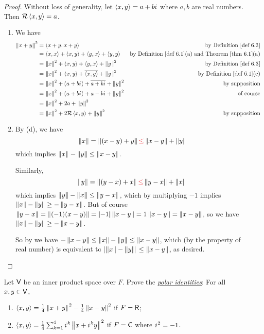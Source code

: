 \begin{proof}
Without loss of generality, let \(\left< x, y \right> = a + b{i\mkern1mu}\) where \(a, b\) are real numbers.
Then \(\mathcal{R}\left< x, y \right> = a\).
\begin{enumerate}
\item We have
\begin{align*}
    \norm{x + y}^2 & = \LG x + y, x + y \RG & \text{by \DEF{6.3}} \\
        & = \LG x, x \RG + \LG x, y \RG + \LG y, x \RG + \LG y, y \RG & \text{by \DEF{6.1}(a) and \THM{6.1}(a)} \\
        & = \norm{x}^2 + \LG x, y \RG + \LG y, x \RG + \norm{y}^2 & \text{by \DEF{6.3}} \\
        & = \norm{x}^2 + \LG x, y \RG + \conjugatet{\LG x, y \RG} + \norm{y}^2 & \text{by \DEF{6.1}(c)} \\
        & = \norm{x}^2 + (a + b\iu) + \conjugatet{a + b\iu} + \norm{y}^2 & \text{by supposition} \\
        & = \norm{x}^2 + (a + b\iu) + a - b\iu + \norm{y}^2 & \text{of course} \\
        & = \norm{x}^2 + 2a + \norm{y}^2 \\
        & = \norm{x}^2 + 2\mathcal{R}\LG x, y \RG + \norm{y}^2 & \text{by supposition}
\end{align*}

\item
By (d), we have
\[
    \norm{x} = \norm{(x - y) + y} \RED{\le} \norm{x - y} + \norm{y}
\]
which implies \(\left\lVert x\right\rVert - \left\lVert y\right\rVert \le \left\lVert x - y\right\rVert\). 

Similarly,
\[
    \norm{y} = \norm{(y - x) + x} \RED{\le} \norm{y - x} + \norm{x}
\]
which implies \(\left\lVert y\right\rVert - \left\lVert x\right\rVert \le \left\lVert y - x\right\rVert\), which by multiplying \(-1\) implies \(\left\lVert x\right\rVert - \left\lVert y\right\rVert \ge -\left\lVert y - x\right\rVert\).
But of course \(\left\lVert y - x\right\rVert = \left\lVert(-1)(x - y)\right\rVert = \lvert-1\rvert\left\lVert x - y\right\rVert = 1\left\lVert x - y\right\rVert = \left\lVert x - y\right\rVert\), so we have \(\left\lVert x\right\rVert - \left\lVert y\right\rVert \ge -\left\lVert x - y\right\rVert\). 

So by  we have \(-\left\lVert x - y\right\rVert \le \left\lVert x\right\rVert - \left\lVert y\right\rVert \le \left\lVert x - y\right\rVert\), which (by the property of real number) is equivalent to \(\left| \left\lVert x\right\rVert - \left\lVert y\right\rVert \right| \le \left\lVert x- y\right\rVert\), as desired.
\end{enumerate}
\end{proof}

\begin{exercise} \label{exercise 6.1.20}
Let \(\textsf{V}\) be an inner product space over \(F\).
Prove the \emph{\href{https://www.wikiwand.com/en/Polarization_identity}{polar identities}}:
For all \(x, y \in \textsf{V}\),
\begin{enumerate}
\item \(\left< x, y \right> = \frac{1}{4} \left\lVert x + y\right\rVert^2 - \frac{1}{4} \left\lVert x - y\right\rVert^2\) if \(F = \textsf{R}\);
\item \(\left< x, y \right> = \frac{1}{4} \sum_{k = 1}^4 {i\mkern1mu}^k \left\lVert x + {i\mkern1mu}^k y\right\rVert^2\) if \(F = \textsf{C}\) where \({i\mkern1mu}^2 = -1\).
\end{enumerate}
\end{exercise}


